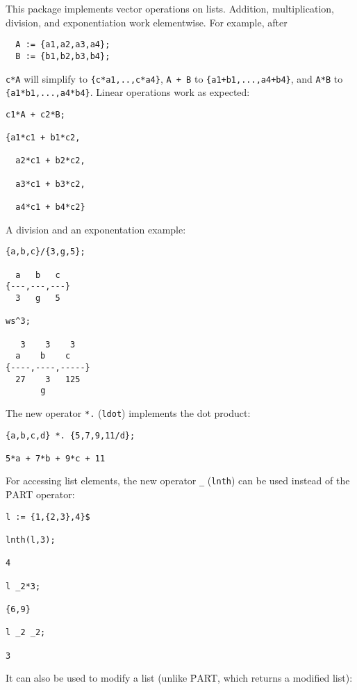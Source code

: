 

This package implements vector operations on lists.
Addition, multiplication, division, and exponentiation work elementwise.
For example, after
\begin{verbatim}
  A := {a1,a2,a3,a4};
  B := {b1,b2,b3,b4};
\end{verbatim}
\texttt{c*A} will simplify to \texttt{\{c*a1,..,c*a4\}}, 
\texttt{A + B} to \texttt{\{a1+b1,...,a4+b4\}}, and
\texttt{A*B} to \texttt{\{a1*b1,...,a4*b4\}}.
Linear operations work as expected:
\begin{verbatim}
c1*A + c2*B;

{a1*c1 + b1*c2,

  a2*c1 + b2*c2,

  a3*c1 + b3*c2,

  a4*c1 + b4*c2}
\end{verbatim}
A division and an exponentation example:
\begin{verbatim}
{a,b,c}/{3,g,5};

  a   b   c
{---,---,---}
  3   g   5

ws^3;

   3    3    3
  a    b    c
{----,----,-----}
  27    3   125
       g
\end{verbatim}
The new operator \texttt{*.} (\texttt{ldot})
 implements
the dot product:
\begin{verbatim}
{a,b,c,d} *. {5,7,9,11/d};

5*a + 7*b + 9*c + 11
\end{verbatim}
For accessing list elements, the new operator \texttt{\_} (\texttt{lnth})
can be used instead of the \f{PART} operator:
\begin{verbatim}
l := {1,{2,3},4}$

lnth(l,3);

4

l _2*3;

{6,9}

l _2 _2;

3
\end{verbatim}
It can also be used to modify a list (unlike \f{PART}, which returns a modified list):
